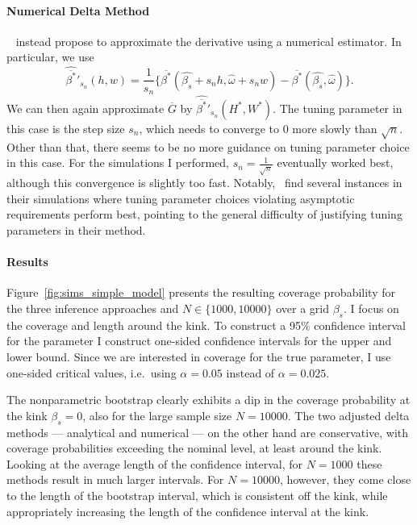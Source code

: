\documentclass[12pt,a4paper,english]{article} %
\numberwithin{equation}{section}
\theoremstyle{definition}
\theoremstyle{remark}
\theoremstyle{plain}
\begin{document}
\paragraph{Numerical Delta Method}
~\cite{hong2018numerical} instead propose to approximate the derivative using a numerical estimator.
In particular, we use
\begin{equation*}
  \hat{\overline{\beta^*}}'_{s_n}(h, w) = \frac{1}{s_n} \{\overline{\beta^*}(\hat{\beta_s} + s_n h, \hat{\omega} + s_n w) - \overline{\beta^*}({\hat{\beta_s}, \hat{\omega}})\}.
\end{equation*}
We can then again approximate $\overline{G}$ by $\hat{\overline{\beta^*}}'_{s_n}(H^*, W^*)$.
The tuning parameter in this case is the step size $s_n$, which needs to converge to $0$ more slowly than $\sqrt{n}$.
Other than that, there seems to be no more guidance on tuning parameter choice in this case.
For the simulations I performed, $s_n = \frac{1}{\sqrt{n}}$ eventually worked best, although this convergence is slightly too fast.
Notably,~\cite{hong2018numerical} find several instances in their simulations where tuning parameter choices violating asymptotic requirements perform best, pointing to the general difficulty of justifying tuning parameters in their method.

\paragraph{Results}
Figure~\ref{fig:sims_simple_model} presents the resulting coverage probability for the three inference approaches and $N\in\{1000, 10000\}$ over a grid $\beta_s$.
I focus on the coverage and length around the kink. To construct a 95\% confidence interval for the parameter I construct one-sided confidence intervals for the upper and lower bound.
Since we are interested in coverage for the true parameter, I use one-sided critical values, i.e.\ using $\alpha=0.05$ instead of $\alpha=0.025$.


The nonparametric bootstrap clearly exhibits a dip in the coverage probability at the kink $\beta_s = 0$, also for the large sample size $N=10000$.
The two adjusted delta methods --- analytical and numerical --- on the other hand are conservative, with coverage probabilities exceeding the nominal level, at least around the kink.
Looking at the average length of the confidence interval, for $N=1000$ these methods result in much larger intervals.
For $N=10000$, however, they come close to the length of the bootstrap interval, which is consistent off the kink, while appropriately increasing the length of the confidence interval at the kink.
\end{document}
